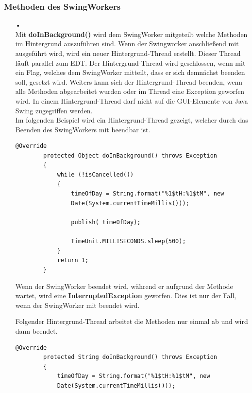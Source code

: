 \subsubsection{Methoden des SwingWorkers}
\begin{itemize}
\item[•] 
\\ Mit \textbf{doInBackground()} wird dem SwingWorker mitgeteilt welche Methoden im Hintergrund auszuführen sind. Wenn der Swingworker anschließend mit  ausgeführt wird, wird ein neuer Hintergrund-Thread erstellt. Dieser Thread läuft parallel zum \ac{EDT}. Der Hintergrund-Thread wird  geschlossen, wenn mit  ein Flag, welches dem SwingWorker mitteilt, dass er sich demnächst beenden soll, gesetzt wird. Weiters kann sich der Hintergrund-Thread beenden, wenn alle Methoden abgearbeitet wurden oder im Thread eine Exception geworfen wird. In einem Hintergrund-Thread darf nicht auf die \ac{GUI}-Elemente von Java Swing zugegriffen werden. 
\\ Im folgenden Beispiel wird ein Hintergrund-Thread gezeigt, welcher durch das Beenden des SwingWorkers mit  beendbar ist.
\begin{lstlisting}[style=JavaStyle, caption=SwingWorker \inlinecode{JavaStyle}{doInBackground()} mit while Schleife]
        @Override
        protected Object doInBackground() throws Exception
        {
            while (!isCancelled())
            {
                timeOfDay = String.format("%1$tH:%1$tM", new
                Date(System.currentTimeMillis()));

                publish( timeOfDay);

                TimeUnit.MILLISECONDS.sleep(500);
            }
            return 1;
        }
\end{lstlisting} 
Wenn der SwingWorker beendet wird, während er aufgrund der Methode \\  wartet, wird eine \textbf{InterruptedException} geworfen. Dies ist nur der Fall, wenn der SwingWorker mit  beendet wird.

\vspace{10pt}

Folgender Hintergrund-Thread arbeitet die Methoden nur einmal ab und wird dann beendet. 
\begin{lstlisting}[style=JavaStyle, caption=SwingWorker \inlinecode{JavaStyle}{doInBackground()} ohne while Schleife, label=SwingWorkerOhneWhileSchleife]
        @Override
        protected String doInBackground() throws Exception
        {
            timeOfDay = String.format("%1$tH:%1$tM", new 
            Date(System.currentTimeMillis()));
            

\end{lstlisting}
\end{itemize}
